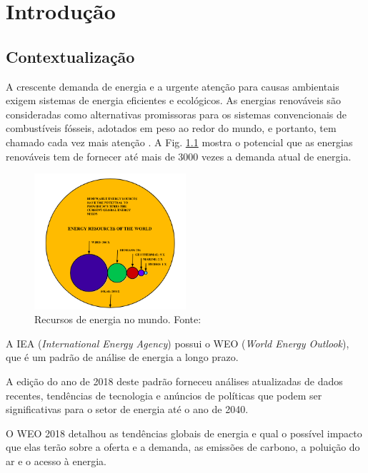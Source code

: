 \chapter [Introdução]{Introdução}

\section{Contextualização}


A crescente demanda de energia e a urgente atenção para causas ambientais exigem sistemas de energia eficientes e ecológicos. 
As energias renováveis são consideradas como alternativas promissoras para os sistemas convencionais de combustíveis fósseis, adotados em peso ao redor do mundo, e portanto, tem chamado cada vez mais atenção \cite{Guo2018}.
A Fig. \ref{fig:energy-resources} mostra o potencial que as energias renováveis tem de fornecer até mais de 3000 vezes a demanda atual de energia.

\begin{figure}[!hbt]
	\begin{center}
    \includegraphics[width=0.5\textwidth]{figuras/Energy_Resources_of_The_World.png}
    \caption{Recursos de energia no mundo. Fonte: \cite{Ellabban2014}}
    \label{fig:energy-resources}
    \end{center}
\end{figure}

A IEA (\textit{International Energy Agency}) possui o WEO (\textit{World Energy Outlook}), que é 
um padrão de análise de energia a longo prazo. 

A edição do ano de 2018 deste padrão 
forneceu análises atualizadas de dados recentes, tendências de tecnologia e anúncios de políticas 
que podem ser significativas para o setor de energia até o ano de 2040.

O WEO 2018 detalhou as tendências globais de energia e qual o possível impacto que elas terão sobre 
a oferta e a demanda, as emissões de carbono, a poluição do ar e o acesso à energia. 

